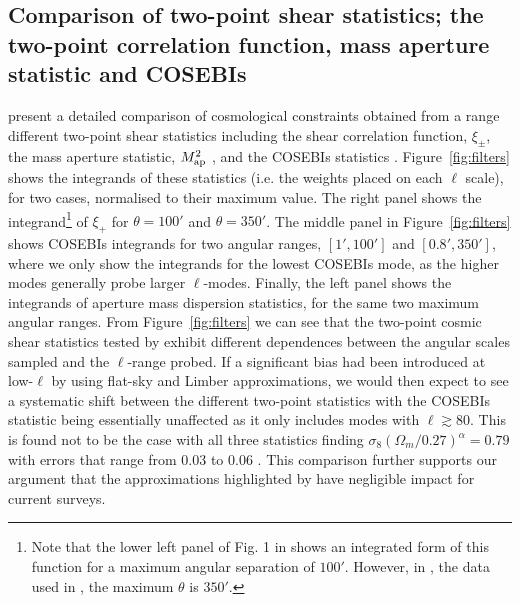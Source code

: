 \subsection{Comparison of two-point shear statistics; the two-point correlation function, mass aperture statistic and COSEBIs}
\citet{kilbinger/etal:2013} present a detailed comparison of cosmological constraints obtained from a range different two-point shear statistics including the shear correlation function, $\xi_\pm$, the mass aperture statistic, $M_ {\rm ap}^2$ \citep{schneider/etal:1998}, and the COSEBIs statistics \citep{schneider/etal:2010}.  Figure~\ref{fig:filters} shows the integrands of these statistics (i.e. the weights placed on each $\ell$ scale),  for two cases, normalised to their maximum value.  The right panel shows the integrand\footnote{Note that the lower left panel of Fig. 1 in \citet{kitching/etal:2016} shows an integrated form of this function for a maximum
angular separation of $100'$. However, in \citet{kilbinger/etal:2013}, the data used in \citet{kitching/etal:2016}, 
the maximum $\theta$ is $350'$.} of $\xi_+$ for $\theta=100'$ and $\theta=350'$. The middle panel in Figure~\ref{fig:filters} shows COSEBIs integrands for two angular ranges, $[1',100']$ and $[0.8',350']$, where we only show the integrands for the lowest COSEBIs mode, as the higher modes generally probe larger $\ell$-modes.  Finally, the left panel shows the integrands of aperture mass dispersion statistics, for the same two maximum angular ranges.
From Figure~\ref{fig:filters} we can see that the two-point cosmic shear statistics tested by \citet{kilbinger/etal:2013} exhibit different dependences between the angular scales sampled and the $\ell$-range probed.   
If a significant bias had been introduced at low-$\ell$ by using flat-sky and Limber approximations, we would then expect to see a systematic shift between the different two-point statistics with the COSEBIs statistic being essentially unaffected as it only includes modes with $\ell \gtrsim 80$.  This is found not to be the case with all three statistics finding $\sigma_8 (\Omega_m/0.27)^\alpha = 0.79$ with errors that range from $0.03$ to $0.06$ \citep[see Table 5 of][]{kilbinger/etal:2013}.  This comparison further supports our argument that the approximations highlighted by \citet{kitching/etal:2016} have negligible impact for current surveys.

